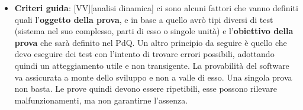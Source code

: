 \begin{itemize}
		\item \textbf{Criteri guida}: [VV][analisi dinamica] ci sono alcuni fattori che vanno definiti quali l'\textbf{oggetto della prova}, e in base a quello avrò tipi diversi di test (sistema nel suo complesso, parti di esso o singole unità) e l'\textbf{obiettivo della prova} che sarà definito nel PdQ. Un altro principio da seguire è quello che devo eseguire dei test con l'intento di trovare errori possibili, adottando quindi un atteggiamento utile e non transigente. La provabilità del software va assicurata a monte dello sviluppo e non a valle di esso. Una singola prova non basta. Le prove quindi devono essere ripetibili, esse possono rilevare malfunzionamenti, ma non garantirne l'assenza.

	\end{itemize}